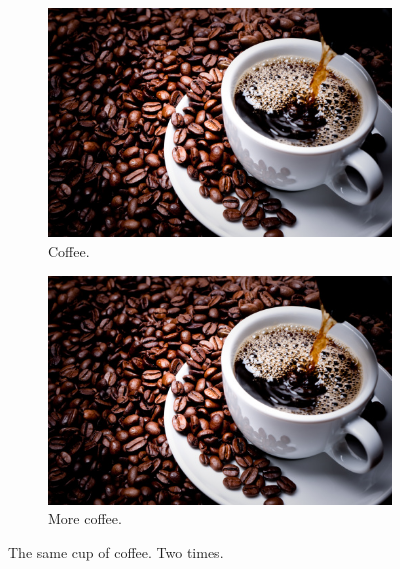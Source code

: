 \documentclass{article}
\begin{document}
	\begin{figure}[h!]
		\centering
		\begin{subfigure}[b]{0.4/linewidth}
			\includegraphics[width=\linewidth]{coffe.jpg}
			\caption{Coffee.}
			\end{subfigure}
		\begin{subfigure}[b]{0.4\linewidth}
			
			\includegraphics[width=\line]{coffe.jpg}
			\caption{More coffee.}
			\end{subfigure}
		\caption{The same cup of coffee. Two times.}
		\label{fig:coffee}
		\end{figure}
\end{document}
